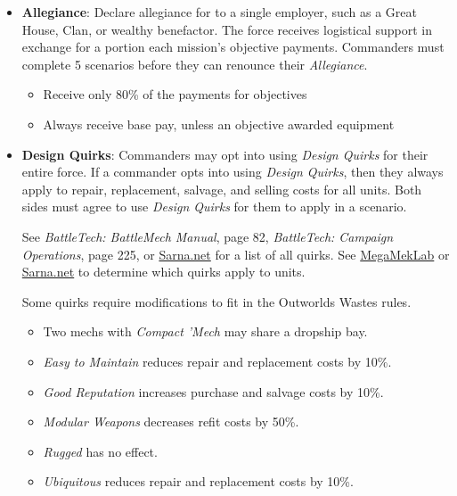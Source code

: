 \documentclass{article}
\begin{document}
\begin{itemize}
\item {\bfseries Allegiance}: Declare allegiance for to a single employer, such as a Great House, Clan, or wealthy benefactor.
The force receives logistical support in exchange for a portion each mission's objective payments.
Commanders must complete 5 scenarios before they can renounce their \emph{Allegiance}.

\begin{itemize}

\item Receive only 80\% of the payments for objectives

\item Always receive base pay, unless an objective awarded equipment

\end{itemize}

\item {\bfseries Design Quirks}: Commanders may opt into using \emph{Design Quirks} for their entire force.
If a commander opts into using \emph{Design Quirks}, then they always apply to repair, replacement, salvage, and selling costs for all units.
Both sides must agree to use \emph{Design Quirks} for them to apply in a scenario.

See \emph{BattleTech: BattleMech Manual}, page 82, \emph{BattleTech: Campaign Operations}, page 225, or \href{https://sarna.net}{Sarna.net} for a list of all quirks.
See \href{https://megamek.org}{MegaMekLab} or \href{https://sarna.net}{Sarna.net} to determine which quirks apply to units.

Some quirks require modifications to fit in the Outworlds Wastes rules.

\begin{itemize}

\item Two mechs with \emph{Compact 'Mech} may share a dropship bay.

\item \emph{Easy to Maintain} reduces repair and replacement costs by 10\%.

\item \emph{Good Reputation} increases purchase and salvage costs by 10\%.

\item \emph{Modular Weapons} decreases refit costs by 50\%.

\item \emph{Rugged} has no effect.

\item \emph{Ubiquitous} reduces repair and replacement costs by 10\%.


\end{itemize}
\end{itemize}
\end{document}

